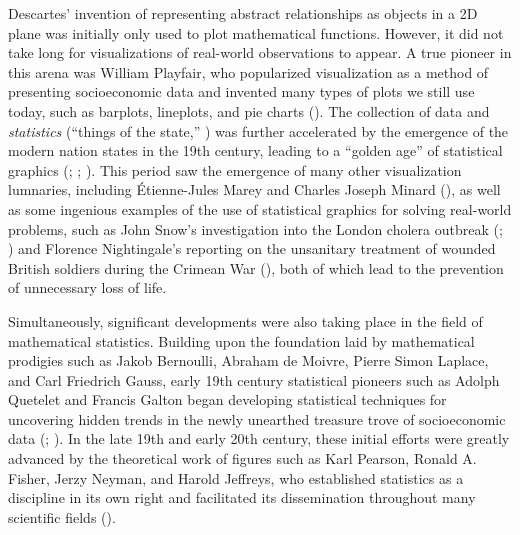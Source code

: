 \documentclass[
  openany]{book}
\theoremstyle{definition}
\theoremstyle{definition}
\theoremstyle{definition}
\theoremstyle{definition}
\theoremstyle{remark}
\begin{document}
Descartes' invention of representing abstract relationships as objects in a 2D plane was initially only used to plot mathematical functions. However, it did not take long for visualizations of real-world observations to appear. A true pioneer in this arena was William Playfair, who popularized visualization as a method of presenting socioeconomic data and invented many types of plots we still use today, such as barplots, lineplots, and pie charts (). The collection of data and \emph{statistics} (``things of the state,'' ) was further accelerated by the emergence of the modern nation states in the 19th century, leading to a ``golden age'' of statistical graphics (; ; ). This period saw the emergence of many other visualization lumnaries, including Étienne-Jules Marey and Charles Joseph Minard (), as well as some ingenious examples of the use of statistical graphics for solving real-world problems, such as John Snow's investigation into the London cholera outbreak (; ) and Florence Nightingale's reporting on the unsanitary treatment of wounded British soldiers during the Crimean War (), both of which lead to the prevention of unnecessary loss of life.

Simultaneously, significant developments were also taking place in the field of mathematical statistics. Building upon the foundation laid by mathematical prodigies such as Jakob Bernoulli, Abraham de Moivre, Pierre Simon Laplace, and Carl Friedrich Gauss, early 19th century statistical pioneers such as Adolph Quetelet and Francis Galton began developing statistical techniques for uncovering hidden trends in the newly unearthed treasure trove of socioeconomic data (; ). In the late 19th and early 20th century, these initial efforts were greatly advanced by the theoretical work of figures such as Karl Pearson, Ronald A. Fisher, Jerzy Neyman, and Harold Jeffreys, who established statistics as a discipline in its own right and facilitated its dissemination throughout many scientific fields ().
\end{document}
